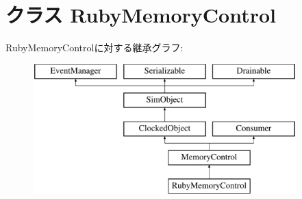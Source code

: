 \hypertarget{classRubyMemoryControl_1_1RubyMemoryControl}{
\section{クラス RubyMemoryControl}
\label{classRubyMemoryControl_1_1RubyMemoryControl}
}
RubyMemoryControlに対する継承グラフ:\begin{figure}[H]
\begin{center}
\leavevmode
\includegraphics[height=5cm]{classRubyMemoryControl_1_1RubyMemoryControl}
\end{center}
\end{figure}
